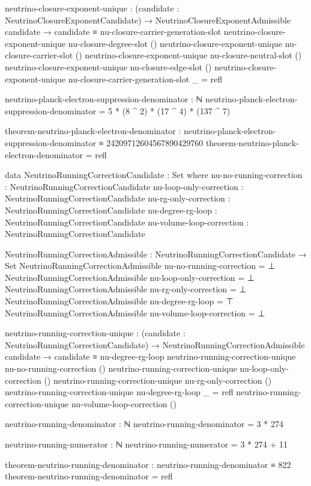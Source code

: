 \documentclass[11pt,a4paper]{book}
\begin{document}
\begin{code}
neutrino-closure-exponent-unique :
  (candidate : NeutrinoClosureExponentCandidate) →
  NeutrinoClosureExponentAdmissible candidate →
  candidate ≡ nu-closure-carrier-generation-slot
neutrino-closure-exponent-unique nu-closure-degree-slot ()
neutrino-closure-exponent-unique nu-closure-carrier-slot ()
neutrino-closure-exponent-unique nu-closure-neutral-slot ()
neutrino-closure-exponent-unique nu-closure-edge-slot ()
neutrino-closure-exponent-unique nu-closure-carrier-generation-slot _ = refl

neutrino-planck-electron-suppression-denominator : ℕ
neutrino-planck-electron-suppression-denominator =
  5 * (8 ^ 2) * (17 ^ 4) * (137 ^ 7)

theorem-neutrino-planck-electron-denominator :
  neutrino-planck-electron-suppression-denominator ≡
  24209712604567890429760
theorem-neutrino-planck-electron-denominator = refl

data NeutrinoRunningCorrectionCandidate : Set where
  nu-no-running-correction  : NeutrinoRunningCorrectionCandidate
  nu-loop-only-correction   : NeutrinoRunningCorrectionCandidate
  nu-rg-only-correction     : NeutrinoRunningCorrectionCandidate
  nu-degree-rg-loop         : NeutrinoRunningCorrectionCandidate
  nu-volume-loop-correction : NeutrinoRunningCorrectionCandidate

NeutrinoRunningCorrectionAdmissible :
  NeutrinoRunningCorrectionCandidate → Set
NeutrinoRunningCorrectionAdmissible nu-no-running-correction = ⊥
NeutrinoRunningCorrectionAdmissible nu-loop-only-correction = ⊥
NeutrinoRunningCorrectionAdmissible nu-rg-only-correction = ⊥
NeutrinoRunningCorrectionAdmissible nu-degree-rg-loop = ⊤
NeutrinoRunningCorrectionAdmissible nu-volume-loop-correction = ⊥

neutrino-running-correction-unique :
  (candidate : NeutrinoRunningCorrectionCandidate) →
  NeutrinoRunningCorrectionAdmissible candidate →
  candidate ≡ nu-degree-rg-loop
neutrino-running-correction-unique nu-no-running-correction ()
neutrino-running-correction-unique nu-loop-only-correction ()
neutrino-running-correction-unique nu-rg-only-correction ()
neutrino-running-correction-unique nu-degree-rg-loop _ = refl
neutrino-running-correction-unique nu-volume-loop-correction ()

neutrino-running-denominator : ℕ
neutrino-running-denominator = 3 * 274

neutrino-running-numerator : ℕ
neutrino-running-numerator = 3 * 274 + 11

theorem-neutrino-running-denominator : neutrino-running-denominator ≡ 822
theorem-neutrino-running-denominator = refl


\end{code}
\end{document}
